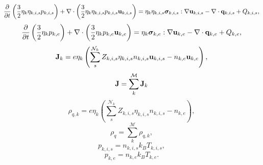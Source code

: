 \documentclass[a4paper,11pt]{report}
\begin{document}
\begin{equation}
    \label{eq:mf_mm_iei}
    \frac{\partial}{\partial t} \left ( \frac{3}{2} \eta_k \eta_{k,i,s} p_{k,i,s} \right ) + \nabla \cdot \left ( \frac{3}{2} \eta_k \eta_{k,i,s} p_{k,i,s} \mathbf{u}_{k,i,s} \right ) = \eta_k \eta_{k,i,s} \bm \sigma_{k,i,s} : \nabla \mathbf{u}_{k,i,s} - \nabla \cdot \mathbf{q}_{k,i,s} + Q_{k,i,s},
\end{equation}
\begin{equation}
    \label{eq:mf_mm_iee}
    \frac{\partial}{\partial t} \left ( \frac{3}{2} \eta_k p_{k,e} \right ) + \nabla \cdot \left ( \frac{3}{2} \eta_k p_{k,e} \mathbf{u}_{k,e} \right ) = \eta_k \bm \sigma_{k,e} : \nabla \mathbf{u}_{k,e} - \nabla \cdot \mathbf{q}_{k,e} + Q_{k,e},
\end{equation}
\begin{equation}
    \label{eq:mf_mm_curr_density}
    \mathbf{J}_k = e \eta_k \left( \sum_s^{\mathcal{N}_k} Z_{k,i,s} \eta_{k,i,s} n_{k,i,s} \mathbf{u}_{k,i,s} - n_{k,e} \mathbf{u}_{k,e} \right),
\end{equation}
\begin{equation}
    \mathbf{J} = \sum_k^\mathcal{M} \mathbf{J}_k
\end{equation}
\begin{equation}
    \label{eq:mf_mm_mass_density}
    \rho_{q,k} = e \eta_k \left( \sum_s^{\mathcal{N}_k} Z_{k,i,s} \eta_{k,i,s} n_{k,i,s} - n_{k,e} \right),
\end{equation}
\begin{equation}
    \rho_q = \sum_k^\mathcal{M} \rho_{q,k},
\end{equation}
\begin{equation}
    \label{eq:mf_mm_eos_ion}
    p_{k,i,s} = n_{k,i,s} k_B T_{k,i,s},
\end{equation}
\begin{equation}
    \label{eq:mf_mm_eos_elec}
    p_{k,e} = n_{k,e} k_B T_{k,e}.
\end{equation}

\end{document}
